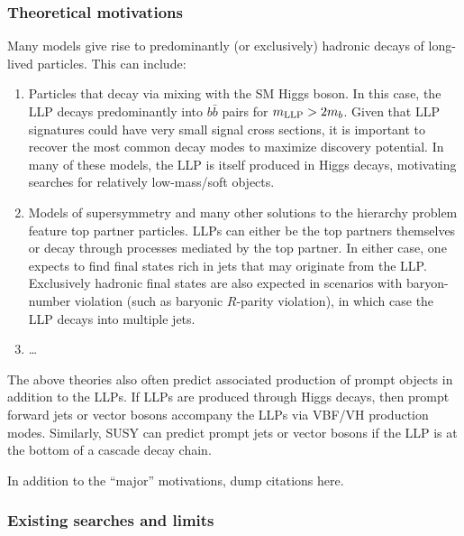 \subsubsection{Theoretical motivations}

Many models give rise to predominantly (or exclusively) hadronic decays of long-lived particles. This can include:

\begin{enumerate}

\item Particles that decay via mixing with the SM Higgs boson. In this case, the LLP decays predominantly into $b\bar{b}$ pairs for $m_{\rm LLP}> 2m_b$. Given that LLP signatures could have very small signal cross sections, it is important to recover the most common decay modes to maximize discovery potential. In many of these models, the LLP is itself produced in Higgs decays, motivating searches for relatively low-mass/soft objects.

\item Models of supersymmetry and many other solutions to the hierarchy problem feature top partner particles. LLPs can either be the top partners themselves or decay through processes mediated by the top partner. In either case, one expects to find final states rich in jets that may originate from the LLP. Exclusively hadronic final states are also expected in scenarios with baryon-number violation (such as baryonic $R$-parity violation), in which case the LLP decays into multiple jets.

\item \ldots

\end{enumerate}

The above theories also often predict associated production of prompt objects in addition to the LLPs. If LLPs are produced through Higgs decays, then prompt forward jets or vector bosons accompany the LLPs via VBF/VH production modes. Similarly, SUSY can predict prompt jets or vector bosons if the LLP is at the bottom of a cascade decay chain.

In addition to the ``major'' motivations, dump citations here.

\subsubsection{Existing searches and limits}

